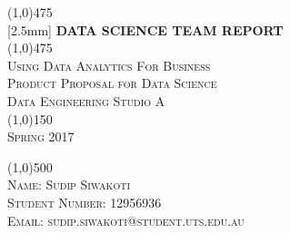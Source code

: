 \documentclass{article}
\begin{document}
\begin{titlepage}
	\begin{center}
    \line(1,0){475}\\
   [2.5mm]
    \huge{\bfseries DATA SCIENCE TEAM REPORT}\\
    \line(1,0){475}\\
    [3mm]
    \textsc{\Large Using Data Analytics For Business}\\
    [6cm]
    \textsc{\small Product Proposal for Data Science\\
    [1mm]
    Data Engineering Studio A\\
    \line(1,0){150}\\
    Spring 2017}\\
    [7cm]
    \end{center}
    \begin{flushleft}
    \line(1,0){500}\\
    \textsc{\large Name: Sudip Siwakoti\\
     Student Number: 12956936\\
     Email: sudip.siwakoti@student.uts.edu.au}\\
    \end{flushleft}
    \lipsum[0]
\end{titlepage}
\tableofcontents
\thispagestyle{empty}
\cleardoublepage
\setcounter{page}{1}
\end{document}
